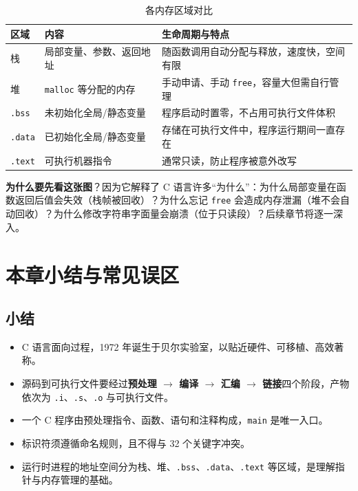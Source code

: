 \begin{table}[H]
\centering
\caption{各内存区域对比}
\label{tab:memory_regions}
\begin{tabularx}{\textwidth}{@{}l l X@{}}
\toprule
\textbf{区域} & \textbf{内容} & \textbf{生命周期与特点} \\
\midrule
栈 & 局部变量、参数、返回地址 & 随函数调用自动分配与释放，速度快，空间有限 \\
堆 & \texttt{malloc} 等分配的内存 & 手动申请、手动 \texttt{free}，容量大但需自行管理 \\
\texttt{.bss} & 未初始化全局/静态变量 & 程序启动时置零，不占用可执行文件体积 \\
\texttt{.data} & 已初始化全局/静态变量 & 存储在可执行文件中，程序运行期间一直存在 \\
\texttt{.text} & 可执行机器指令 & 通常只读，防止程序被意外改写 \\
\bottomrule
\end{tabularx}
\end{table}

\textbf{为什么要先看这张图}？因为它解释了 C 语言许多“为什么”：为什么局部变量在函数返回后值会失效（栈帧被回收）？为什么忘记 \texttt{free} 会造成内存泄漏（堆不会自动回收）？为什么修改字符串字面量会崩溃（位于只读段）？后续章节将逐一深入。

\section{本章小结与常见误区}

\subsection{小结}

\begin{itemize}
    \item C 语言面向过程，1972 年诞生于贝尔实验室，以贴近硬件、可移植、高效著称。
    \item 源码到可执行文件要经过\textbf{预处理 $\to$ 编译 $\to$ 汇编 $\to$ 链接}四个阶段，产物依次为 \texttt{.i}、\texttt{.s}、\texttt{.o} 与可执行文件。
    \item 一个 C 程序由预处理指令、函数、语句和注释构成，\texttt{main} 是唯一入口。
    \item 标识符须遵循命名规则，且不得与 32 个关键字冲突。
    \item 运行时进程的地址空间分为栈、堆、\texttt{.bss}、\texttt{.data}、\texttt{.text} 等区域，是理解指针与内存管理的基础。
\end{itemize}

